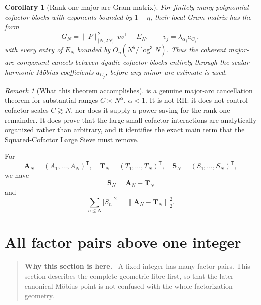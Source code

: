 \documentclass[11pt]{article}
\newtheorem{corollary}[theorem]{Corollary}
\theoremstyle{definition}
\theoremstyle{remark}
\newtheorem{remark}[theorem]{Remark}
\newcommand{\1}{\mathbf{1}}
\newcommand{\vect}[1]{\bm{#1}}
\newcommand{\norm}[1]{\left\lVert #1\right\rVert}
\newenvironment{motivation}
  {\begin{quote}\small\color{ovvogray}\textbf{Why this section is here.}\ }
  {\end{quote}}
\begin{document}
\begin{corollary}[Rank-one major-arc Gram matrix]
\label{cor:rank-one-Gram}
For finitely many polynomial cofactor blocks with exponents bounded by
$1-\eta$, their local Gram matrix has the form
\begin{equation}
 G_N
 =\|P\|_{[N,2N)}^2\,vv^{\mathsf T}+E_N,
 \qquad
 v_j=\lambda_{\alpha_j}a_{C_j},
 \label{eq:Gram-rank-one-form}
\end{equation}
with every entry of $E_N$ bounded by
$O_\eta(N^5/\log^3N)$.  Thus the coherent major-arc component cancels
between dyadic cofactor blocks entirely through the scalar harmonic
M\"obius coefficients $a_{C_j}$, before any minor-arc estimate is used.
\end{corollary}

\begin{remark}[What this theorem accomplishes]
 is a genuine major-arc cancellation theorem
for substantial ranges $C\asymp N^\alpha$, $\alpha<1$.  It is not RH:
it does not control cofactor scales $C\gtrsim N$, nor does it supply a
power saving for the rank-one remainder.  It does prove that the large
small-cofactor interactions are analytically organized rather than
arbitrary, and it identifies the exact main term that the
Squared-Cofactor Large Sieve must remove.
\end{remark}

For
\[
 \vect A_N=(A_1,\ldots,A_N)^{\mathsf T},
 \quad
 \vect T_N=(T_1,\ldots,T_N)^{\mathsf T},
 \quad
 \vect S_N=(S_1,\ldots,S_N)^{\mathsf T},
\]
we have
\begin{equation}
 \vect S_N=\vect A_N-\vect T_N
 \label{eq:vector-AT}
\end{equation}
and
\begin{equation}
 \sum_{n\le N}|S_n|^2
 =\norm{\vect A_N-\vect T_N}_2^2.
 \label{eq:energy-AT}
\end{equation}

\section{All factor pairs above one integer}
\label{sec:full-fibre}

\begin{motivation}
A fixed integer has many factor pairs.  This section describes the complete geometric fibre first, so that the later canonical M\"obius point is not confused with the whole factorization geometry.
\end{motivation}
\end{document}
